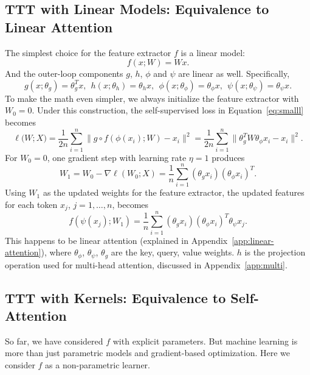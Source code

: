 \documentclass{article} %
\begin{document}
\subsection{TTT with Linear Models: Equivalence to Linear Attention}
\label{subsec:linear}
The simplest choice for the feature extractor $f$ is a linear model:
\begin{equation}
f(x; W) = W x.
\end{equation}
And the outer-loop components $g$, $h$, $\phi$ and $\psi$ are linear as well. Specifically, 
\begin{equation}
g(x; \theta_g) = \theta_g^T x,~~
h(x; \theta_h) = \theta_h x,~~
\phi(x; \theta_\phi) = \theta_\phi x,~~
\psi(x; \theta_\psi) = \theta_\psi x.
\end{equation}
To make the math even simpler, we always initialize the feature extractor with $W_0 = 0$.
Under this construction, the self-supervised loss in Equation~\ref{eq:smalll} becomes
\begin{equation}
\label{eq:tokl}
\ell\big( W; X \big) 
= \frac{1}{2n} \sum_{i=1}^n\| g \circ f\left(\phi(x_i); W\right) -  x_i \|^2 
= \frac{1}{2n} \sum_{i=1}^n \|\theta_g^TW \theta_\phi x_i - x_i\|^2.
\end{equation}
For $W_0 = 0$, one gradient step with learning rate $\eta=1$ produces
\begin{equation}
W_1 = W_0 - \nabla \ell\left(W_0; X\right) 
= \frac{1}{n} \sum_{i=1}^n (\theta_g x_i) (\theta_\phi x_i)^T.
\end{equation}
Using $W_1$ as the updated weights for the feature extractor, the updated features for each token $x_j$, $j=1,\dots,n$, becomes
\begin{equation}
f\left(\psi(x_j); W_1\right)
 = \frac{1}{n} \sum_{i=1}^n (\theta_g x_i) (\theta_\phi x_i)^T \theta_\psi x_j.
\end{equation}
This happens to be linear attention (explained in Appendix~\ref{app:linear-attention}), where $\theta_\phi$, $\theta_\psi$, $\theta_g$ are the key, query, value weights.
$h$ is the projection operation used for multi-head attention, discussed in Appendix~\ref{app:multi}.

\subsection{TTT with Kernels: Equivalence to Self-Attention}
\label{subsec:kernel}
So far, we have considered $f$ with explicit parameters.
But machine learning is more than just parametric models and gradient-based optimization.
Here we consider $f$ as a non-parametric learner.
\end{document}
